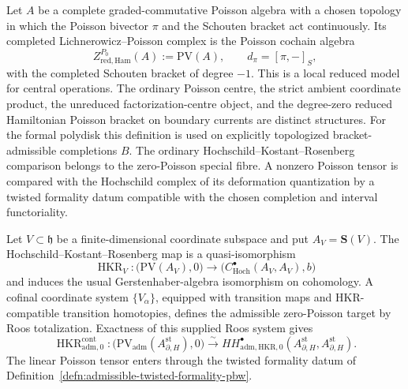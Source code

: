 \documentclass[11pt]{memoir}
\begin{document}
\begin{defn}\label{defn:reduced-hamiltonian-p0-center}
  Let \(A\) be a complete graded-commutative Poisson algebra with a
  chosen topology in which the Poisson bivector \(\pi\) and the
  Schouten bracket act continuously. Its completed
  Lichnerowicz--Poisson complex is the Poisson cochain algebra
  \[
    Z^{P_0}_{\mathrm{red,Ham}}(A)
      :=\mathrm{PV}(A),\qquad d_{\pi}=[\pi,-]_S,
  \]
  with the completed Schouten bracket of degree \(-1\). This is a local
  reduced model for central operations.  The ordinary Poisson centre,
  the strict ambient coordinate product, the unreduced
  factorization-centre object, and the degree-zero reduced Hamiltonian
  Poisson bracket on boundary currents are distinct structures.  For
  the formal polydisk this definition is used on explicitly topologized
  bracket-admissible completions \(B\).
  The ordinary Hochschild--Kostant--Rosenberg comparison belongs to the
  zero-Poisson special fibre.  A nonzero Poisson tensor is compared with
  the Hochschild complex of its deformation quantization by a twisted
  formality datum compatible with the chosen completion and interval
  functoriality.
\end{defn}

\begin{prop}
\label{prop:continuous-admissible-hkr-trace-target}
  Let \(V\subset\mathfrak h\) be a finite-dimensional coordinate
  subspace and put \(A_V=\mathbf S(V)\).  The
  Hochschild--Kostant--Rosenberg map is a quasi-isomorphism
  \[
    \operatorname{HKR}_V\colon
    \bigl(\mathrm{PV}(A_V),0\bigr)
    \longrightarrow
    \bigl(C^\bullet_{\mathrm{Hoch}}(A_V,A_V),b\bigr)
  \]
  and induces the usual Gerstenhaber-algebra isomorphism on cohomology.
  A cofinal coordinate system \(\{V_\alpha\}\), equipped with
  transition maps and HKR-compatible transition homotopies, defines the
  admissible zero-Poisson target by Roos totalization.  Exactness of this
  supplied Roos system gives
  \[
    \operatorname{HKR}^{\mathrm{cont}}_{\mathrm{adm},0}\colon
    \bigl(\mathrm{PV}_{\mathrm{adm}}
      (A_{\partial,H}^{\mathrm{st}}),0\bigr)
    \xrightarrow{\sim}
    HH^\bullet_{\mathrm{adm},\mathrm{HKR},0}
      (A_{\partial,H}^{\mathrm{st}},A_{\partial,H}^{\mathrm{st}}).
  \]
  The linear Poisson tensor enters through the twisted formality datum
  of Definition~\ref{defn:admissible-twisted-formality-pbw}.
\end{prop}
\end{document}
